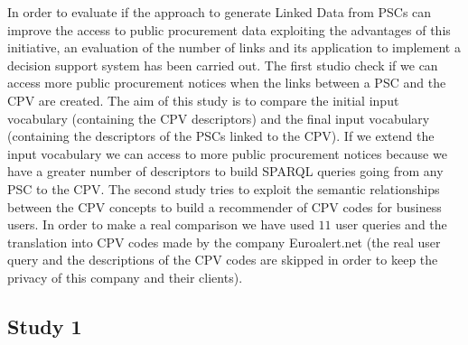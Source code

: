 In order to evaluate if the approach to generate Linked Data from PSCs can improve the access to public procurement data 
exploiting the advantages of this initiative, an evaluation of the number of links and its application to implement a decision 
support system has been carried out. The first studio check if we can access more public procurement notices when the 
links between a PSC and the CPV are created. The aim of this study is to compare the initial input vocabulary (containing the CPV descriptors) and 
the final input vocabulary (containing the descriptors of the PSCs linked to the CPV). If we extend the input vocabulary we can access to more 
public procurement notices because we have a greater number of descriptors to build SPARQL queries going from any PSC to the CPV. 
The second study tries to exploit the semantic relationships between the CPV concepts to build a recommender of CPV codes for business users. 
In order to make a real comparison we have used $11$ user queries and the translation into CPV codes made by the company Euroalert.net 
(the real user query and the descriptions of the CPV codes are skipped in order to keep the privacy of this company and their clients).
\subsection{Study 1}
